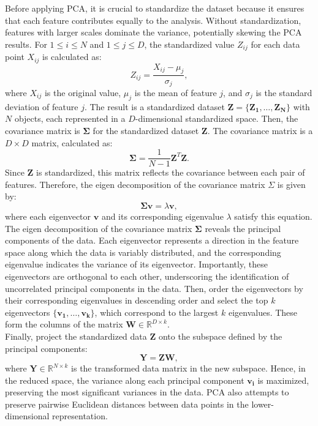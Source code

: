 \documentclass{article}\usepackage[]{graphicx}\usepackage[]{xcolor}
\numberwithin{equation}{section}
\begin{document}
{\noindent
Before applying PCA, it is crucial to standardize the dataset because it ensures that each feature contributes equally to the analysis. Without standardization, features with larger scales dominate the variance, potentially skewing the PCA results. For $1 \leq i \leq N$ and $1 \leq j \leq D$, the standardized value $Z_{ij}$ for each data point $X_{ij}$ is calculated as:
    \[Z_{ij} = \frac{X_{ij} - \mu_j}{\sigma_j},\]
where $X_{ij}$ is the original value, $\mu_j$ is the mean of feature $j$, and $\sigma_j$ is the standard deviation of feature $j$. The result is a standardized dataset $\mathbf{Z} = \{\mathbf{Z_1}, \dots, \mathbf{Z_N}\}$ with $N$ objects, each represented in a $D$-dimensional standardized space. Then, the covariance matrix is $\mathbf{\Sigma}$ for the standardized dataset $\mathbf{Z}$. The covariance matrix is a $D \times D$ matrix, calculated as:
    \[\mathbf{\Sigma} = \frac{1}{N-1} \mathbf{Z}^T \mathbf{Z}.\]
Since $\mathbf{Z}$ is standardized, this matrix reflects the covariance between each pair of features. Therefore, the eigen decomposition of the covariance matrix $\Sigma$ is given by:
    \[\mathbf{\Sigma} \mathbf{v} = \lambda \mathbf{v},\]
where each eigenvector $\mathbf{v}$ and its corresponding eigenvalue $\lambda$ satisfy this equation. The eigen decomposition of the covariance matrix $\mathbf{\Sigma}$ reveals the principal components of the data. Each eigenvector represents a direction in the feature space along which the data is variably distributed, and the corresponding eigenvalue indicates the variance of its eigenvector. Importantly, these eigenvectors are orthogonal to each other, underscoring the identification of uncorrelated principal components in the data. Then, order the eigenvectors by their corresponding eigenvalues in descending order and select the top $k$ eigenvectors $\{\mathbf{v_1}, \ldots, \mathbf{v_k}\}$, which correspond to the largest $k$ eigenvalues. These form the columns of the matrix $\mathbf{W} \in \mathbb{R}^{D \times k}$.\\

\noindent
Finally, project the standardized data $\mathbf{Z}$ onto the subspace defined by the principal components:
    \[\mathbf{Y} = \mathbf{Z}\mathbf{W},\]
where $\mathbf{Y} \in \mathbb{R}^{N \times k}$ is the transformed data matrix in the new subspace. Hence, in the reduced space, the variance along each principal component $\mathbf{v_i}$ is maximized, preserving the most significant variances in the data. PCA also attempts to preserve pairwise Euclidean distances between data points in the lower-dimensional representation.    

}
\end{document}
